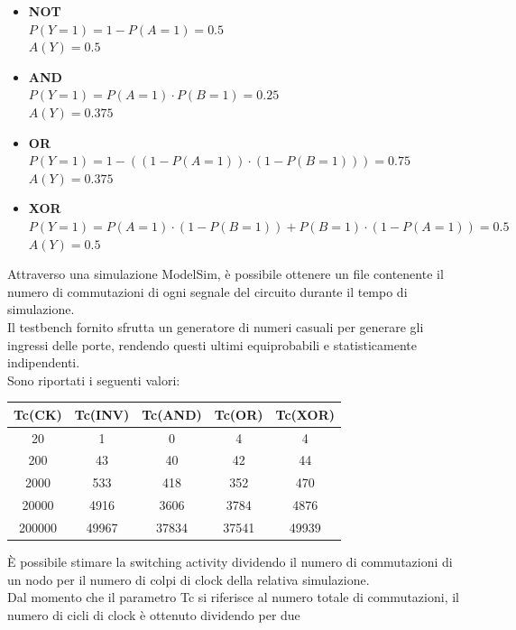 \documentclass[11pt,  english, makeidx, a4paper, titlepage, oneside]{book}
\begin{document}
\begin{itemize}
	\item \textbf{NOT} \\
	$P(Y=1) = 1 - P(A=1) = 0.5$ \\
	$A(Y) = 0.5$
	\item \textbf{AND} \\
	$P(Y=1) = P(A=1) \cdot P(B=1) = 0.25$ \\
	$A(Y) = 0.375$
	\item \textbf{OR} \\
	$P(Y=1) = 1-((1-P(A=1)) \cdot(1-P(B=1))) = 0.75$ \\
	$A(Y) = 0.375$
	\item \textbf{XOR} \\
	$P(Y=1) = P(A=1) \cdot(1-P(B=1)) + P(B=1) \cdot(1-P(A=1)) = 0.5$ \\
	$A(Y) = 0.5$ 
\end{itemize} 
Attraverso una simulazione ModelSim, è possibile ottenere un file 
contenente il numero di commutazioni di ogni segnale del circuito durante il 
tempo di simulazione.
\\
Il testbench fornito sfrutta un generatore di numeri casuali per generare gli 
ingressi delle porte, rendendo questi ultimi equiprobabili e statisticamente 
indipendenti.
\\
Sono riportati i seguenti valori:
\\
\begin{center}
	\begin{tabular}{|c|c|c|c|c|} %
 	\hline %
 	Tc(CK) & Tc(INV) & Tc(AND) & Tc(OR) & Tc(XOR) \\ 
 	\hline
 	20 & 1 & 0 & 4 & 4 \\ 
 	\hline
 	200 & 43 & 40 & 42 & 44 \\ 
 	\hline
 	2000 & 533 & 418 & 352 & 470 \\
 	\hline
 	20000 & 4916 & 3606 & 3784 & 4876 \\
 	\hline
 	200000 & 49967 & 37834 & 37541 & 49939 \\
 	\hline
	\end{tabular}
\end{center}
\vspace{0.3cm}
È possibile stimare la switching activity dividendo il numero 
di commutazioni di un nodo per il numero di colpi di clock della
relativa simulazione.
\\
Dal momento che il parametro Tc si riferisce al numero totale di 
commutazioni, il numero di cicli di clock è ottenuto dividendo per due
\end{document}
